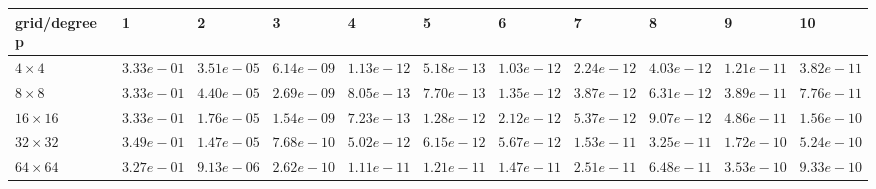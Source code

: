 \begin{tabular}{lllllllllll}
\hline
 grid/degree p   & 1          & 2          & 3          & 4          & 5          & 6          & 7          & 8          & 9          & 10         \\
\hline
 $4 \times 4$    & $3.33e-01$ & $3.51e-05$ & $6.14e-09$ & $1.13e-12$ & $5.18e-13$ & $1.03e-12$ & $2.24e-12$ & $4.03e-12$ & $1.21e-11$ & $3.82e-11$ \\
 $8 \times 8$    & $3.33e-01$ & $4.40e-05$ & $2.69e-09$ & $8.05e-13$ & $7.70e-13$ & $1.35e-12$ & $3.87e-12$ & $6.31e-12$ & $3.89e-11$ & $7.76e-11$ \\
 $16 \times 16$  & $3.33e-01$ & $1.76e-05$ & $1.54e-09$ & $7.23e-13$ & $1.28e-12$ & $2.12e-12$ & $5.37e-12$ & $9.07e-12$ & $4.86e-11$ & $1.56e-10$ \\
 $32 \times 32$  & $3.49e-01$ & $1.47e-05$ & $7.68e-10$ & $5.02e-12$ & $6.15e-12$ & $5.67e-12$ & $1.53e-11$ & $3.25e-11$ & $1.72e-10$ & $5.24e-10$ \\
 $64 \times 64$  & $3.27e-01$ & $9.13e-06$ & $2.62e-10$ & $1.11e-11$ & $1.21e-11$ & $1.47e-11$ & $2.51e-11$ & $6.48e-11$ & $3.53e-10$ & $9.33e-10$ \\
\hline
\end{tabular}
